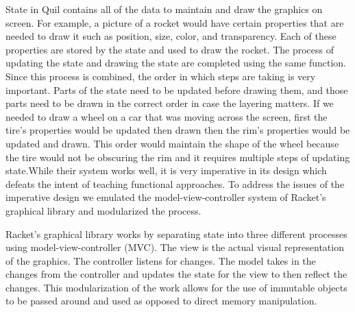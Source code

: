 \documentclass[12pt]{article}
\begin{document}
State in Quil contains all of the data to maintain and draw the graphics on screen. For example, a picture of a rocket would have certain properties that are needed to draw it such as position, size, color, and transparency. Each of these properties are stored by the state and used to draw the rocket. The process of updating the state and drawing the state are completed using the same function. Since this process is combined, the order in which steps are taking is very important. Parts of the state need to be updated before drawing them, and those parts need to be drawn in the correct order in case the layering matters. If we needed to draw a wheel on a car that was moving across the screen, first the tire's properties would be updated then drawn then the rim's properties would be updated and drawn. This order would maintain the shape of the wheel because the tire would not be obscuring the rim and it requires multiple steps of updating state.While their system works well, it is very imperative in its design which defeats the intent of teaching functional approaches. To address the issues of the imperative design we emulated the model-view-controller system of Racket's graphical library and modularized the process. 

Racket's graphical library works by separating state into three different processes using model-view-controller (MVC). The view is the actual visual representation of the graphics. The controller listens for changes. The model takes in the changes from the controller and updates the state for the view to then reflect the changes. This modularization of the work allows for the use of immutable objects to be passed around and used as opposed to direct memory manipulation.
\end{document}
